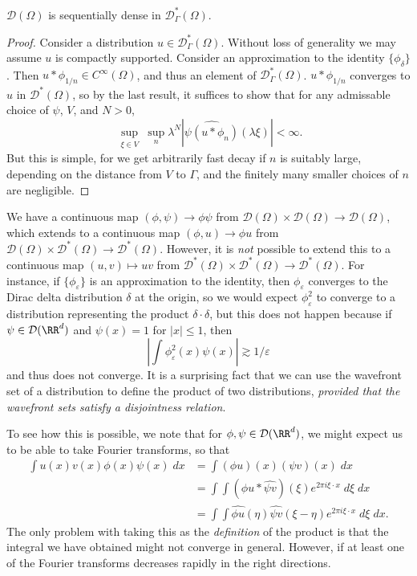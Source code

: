 \begin{theorem}
    $\mathcal{D}(\Omega)$ is sequentially dense in $\mathcal{D}^*_\Gamma(\Omega)$.
\end{theorem}
\begin{proof}
    Consider a distribution $u \in \mathcal{D}^*_\Gamma(\Omega)$. Without loss of generality we may assume $u$ is compactly supported. Consider an approximation to the identity $\{ \phi_\delta \}$. Then $u * \phi_{1/n} \in C^\infty(\Omega)$, and thus an element of $\mathcal{D}^*_\Gamma(\Omega)$. $u * \phi_{1/n}$ converges to $u$ in $\mathcal{D}^*(\Omega)$, so by the last result, it suffices to show that for any admissable choice of $\psi$, $V$, and $N > 0$,
    \[ \sup_{\substack{\xi \in V}} \sup_n \lambda^N |\widehat{\psi (u * \phi_n)}(\lambda \xi)| < \infty. \]
    But this is simple, for we get arbitrarily fast decay if $n$ is suitably large, depending on the distance from $V$ to $\Gamma$, and the finitely many smaller choices of $n$ are negligible.
\end{proof}

We have a continuous map $(\phi,\psi) \to \phi \psi$ from $\mathcal{D}(\Omega) \times \mathcal{D}(\Omega) \to \mathcal{D}(\Omega)$, which extends to a continuous map $(\phi,u) \to \phi u$ from $\mathcal{D}(\Omega) \times \mathcal{D}^*(\Omega) \to \mathcal{D}^*(\Omega)$. However, it is \emph{not} possible to extend this to a continuous map $(u,v) \mapsto uv$ from $\mathcal{D}^*(\Omega) \times \mathcal{D}^*(\Omega) \to \mathcal{D}^*(\Omega)$. For instance, if $\{ \phi_\varepsilon \}$ is an approximation to the identity, then $\phi_\varepsilon$ converges to the Dirac delta distribution $\delta$ at the origin, so we would expect $\phi_\varepsilon^2$ to converge to a distribution representing the product $\delta \cdot \delta$, but this does not happen because if $\psi \in \mathcal{D}(\RR^d)$ and $\psi(x) = 1$ for $|x| \leq 1$, then
%
\[ \left| \int \phi_\varepsilon^2(x) \psi(x) \right| \gtrsim 1/\varepsilon \]
%
and thus does not converge. It is a surprising fact that we can use the wavefront set of a distribution to define the product of two distributions, \emph{provided that the wavefront sets satisfy a disjointness relation}.

To see how this is possible, we note that for $\phi,\psi \in \mathcal{D}(\RR^d)$, we might expect us to be able to take Fourier transforms, so that
%
\begin{align*}
    \int u(x) v(x) \phi(x) \psi(x)\; dx &= \int (\phi u)(x) (\psi v)(x)\; dx\\
    &= \int \int (\widehat{\phi u} * \widehat{\psi v})(\xi) e^{2 \pi i \xi \cdot x}\; d\xi\; dx\\
    &= \int \int \widehat{\phi u}(\eta) \widehat{\psi v}(\xi - \eta) e^{2 \pi i \xi \cdot x}\; d\xi\; dx.
\end{align*}
%
The only problem with taking this as the \emph{definition} of the product is that the integral we have obtained might not converge in general. However, if at least one of the Fourier transforms decreases rapidly in the right directions.

